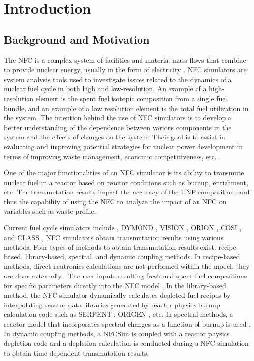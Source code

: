 \section{Introduction}



\subsection{Background and Motivation}
The \gls{NFC} is a complex system of facilities and material 
mass flows that combine to provide nuclear energy, usually in the form of electricity 
\cite{yacout_modeling_2005}. 
\gls{NFC} simulators are system analysis tools used to investigate 
issues related to the dynamics of a nuclear fuel cycle in both 
high and low-resolution. 
An example of a high-resolution element is the spent fuel 
isotopic composition from a single fuel bundle, and an example 
of a low resolution element is the total fuel utilization in 
the system. 
The intention behind the use of \gls{NFC} simulators is to develop 
a better understanding of the dependence between various components 
in the system and the effects of changes on the system. 
Their goal is to assist in evaluating and improving potential 
strategies for nuclear power development in terms of improving waste 
management, economic competitiveness, etc. \cite{yacout_modeling_2005}.   

One of the major functionalities of an \gls{NFC} simulator is its 
ability to transmute nuclear fuel in a reactor based on reactor 
conditions such as burnup, enrichment, etc. 
The transmutation results impact the accuracy of the \gls{UNF} 
composition, and thus the capability of using the \gls{NFC} to 
analyze the impact of an \gls{NFC} on variables such as waste profile.  

Current fuel cycle simulators include 
\Cyclus \cite{huff_fundamental_2016},
DYMOND \cite{yacout_modeling_2005},
VISION \cite{jacobson_verifiable_2010},
ORION \cite{gregg_analysis_2012}, 
COSI \cite{coquelet-pascal_cosi6:_2015}, 
and CLASS \cite{mouginot_class_2012}, 
NFC simulators obtain transmutation results using 
various methods.  
Four types of methods to obtain transmutation 
results exist: recipe-based, library-based, spectral, and dynamic 
coupling methods. 
In recipe-based methods, direct neutronics calculations are not performed 
within the model, they are done externally \cite{yacout_vision_2006}. 
The user inputs resulting fresh and spent fuel compositions for specific 
parameters directly into the \gls{NFC} model \cite{sunny_transition_2015}. 
In the library-based method,  the \gls{NFC} simulator dynamically 
calculates depleted fuel recipes by interpolating reactor data libraries 
generated by reactor physics burnup calculation code such as SERPENT 
\cite{leppanen_serpent_2013}, \gls{ORIGEN} \cite{croff_users_1980}, etc. 
In spectral methods, a reactor model that incorporates spectral 
changes as a function of burnup is used \cite{scopatz_essential_2011}. 
In dynamic coupling methods, a \gls{NFCSim} is coupled with a reactor 
physics depletion code and a depletion calculation is conducted 
during a \gls{NFC} simulation to obtain time-dependent 
transmutation results. 

